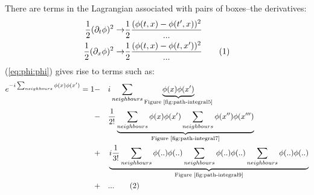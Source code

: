 \documentclass[]{article}
\newcommand\numberthis{\addtocounter{equation}{1}\tag{\theequation}}
\begin{document}
There are terms in the Lagrangian associated with pairs of boxes--the derivatives:
\begin{align*}
	\frac{1}{2}(\partial_t \phi)^2 \rightarrow& \frac{1}{2}\frac{(\phi(t,x)-\phi(t^\prime,x))^2}{...}\\
	\frac{1}{2}(\partial_x \phi)^2 \rightarrow& \frac{1}{2}\frac{(\phi(t,x)-\phi(t,x^\prime))^2}{...} \numberthis \label{eq:phi:phi}
\end{align*}
(\ref{eq:phi:phi}) gives rise to terms such as:
\begin{alignat*}{2}
	e^{- i \sum_{neighbours} \phi(x) \phi(x^\prime)}=1& -&& i \sum_{neighbours} \underbrace{\phi(x) \phi(x^\prime)}_\text{Figure \ref{fig:path-integral5}}\\
&-&& \frac{1}{2!}\underbrace{\sum_{neighbours} \phi(x) \phi(x^\prime)\sum_{neighbours} \phi(x^{\prime\prime}) \phi(x^{\prime\prime\prime})}_\text{Figure \ref{fig:path-integral7}}\\
&+&&\underbrace{i\frac{1}{3!}\sum_{neighbours}\phi(..)\phi(..)\sum_{neighbours}\phi(..)\phi(..)\sum_{neighbours}\phi(..)\phi(..)}_\text{Figure \ref{fig:path-integral9}}\\
&+&& ... \numberthis \label{eq:path:integral:expanded}
\end{alignat*}
\end{document}
